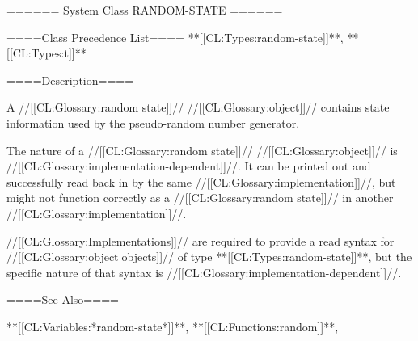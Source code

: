 ====== System Class RANDOM-STATE ======

====Class Precedence List==== **[[CL:Types:random-state]]**, **[[CL:Types:t]]**

====Description====

A //[[CL:Glossary:random state]]// //[[CL:Glossary:object]]// contains state information used by the pseudo-random number generator.

The nature of a //[[CL:Glossary:random state]]// //[[CL:Glossary:object]]// is //[[CL:Glossary:implementation-dependent]]//. It can be printed out and successfully read back in by the same //[[CL:Glossary:implementation]]//, but might not function correctly as a //[[CL:Glossary:random state]]// in another //[[CL:Glossary:implementation]]//.

//[[CL:Glossary:Implementations]]// are required to provide a read syntax for //[[CL:Glossary:object|objects]]// of type **[[CL:Types:random-state]]**, but the specific nature of that syntax is //[[CL:Glossary:implementation-dependent]]//.

====See Also====

**[[CL:Variables:*random-state*]]**, **[[CL:Functions:random]]**, {\secref\PrintingRandomStates}

